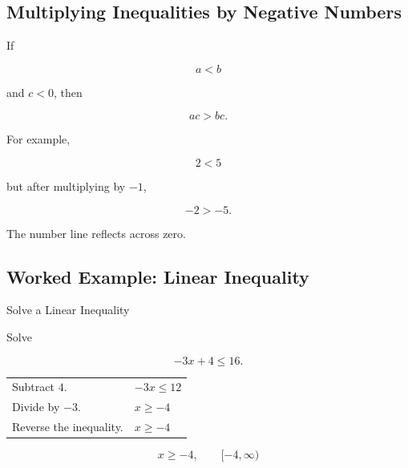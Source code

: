 \subsection{Multiplying Inequalities by Negative Numbers}
\label{subsec:negative-inequality-reversal}

If

\[ a<b \]

and \(c<0\), then

\[ ac>bc. \]

For example,

\[ 2<5 \]

but after multiplying by \(-1\),

\[ -2>-5. \]

The number line reflects across zero.

\begin{center}
\end{center}

\subsection{Worked Example: Linear Inequality}
\label{subsec:worked-linear-inequality}

\begin{workedexamplebox}{Solve a Linear Inequality}

Solve

\[ -3x+4\leq16. \]

\begin{tabularx}{\textwidth}{@{}>{\raggedright\arraybackslash}p{}X@{}}
Subtract \(4\). & \(-3x\leq12\)\\
Divide by \(-3\). & \(x\geq-4\)\\
Reverse the inequality. & \(x\geq-4\)
\end{tabularx}

\begin{center}
\end{center}

\begin{answerbox}
\[ x\geq-4,\qquad [-4,\infty) \]
\end{answerbox}
\end{workedexamplebox}


